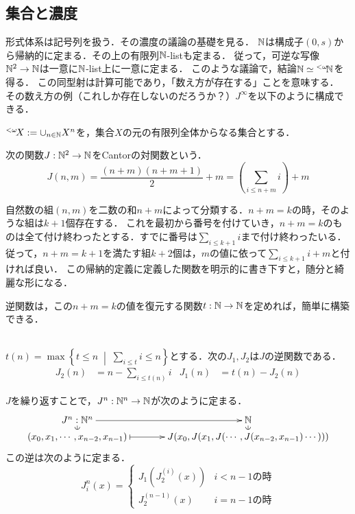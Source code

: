 \documentclass[uplatex, 12pt, dvipdfmx]{jsreport}
\begin{document}
\subsection{集合と濃度}

\begin{screen}
形式体系は記号列を扱う．その濃度の議論の基礎を見る．
$\mathbb{N}$は構成子$(0,s)$から帰納的に定まる．その上の有限列$\mathbb{N}$-listも定まる．
従って，可逆な写像$\mathbb{N}^2\to\mathbb{N}$は一意に$\mathbb{N}$-list上に一意に定まる．
このような議論で，結論$\mathbb{N}\simeq{}^{<\omega}\!\mathbb{N}$を得る．
この同型射は計算可能であり，「数え方が存在する」ことを意味する．
その数え方の例（これしか存在しないのだろうか？）$J^\infty$を以下のように構成できる．
\end{screen}

\begin{notation}
    ${}^{<\omega}\!X:=\cup_{n\in\mathbb{N}}X^n$を，集合$X$の元の有限列全体からなる集合とする．
\end{notation}

\begin{definition}
    次の関数$J:\mathbb{N}^2\to\mathbb{N}$をCantorの対関数という．
    \[ J(n,m) = \frac{(n+m)(n+m+1)}{2} + m = \left(\sum_{i\le n+m}i\right) + m \]
\end{definition}
\begin{remark}
    自然数の組$(n,m)$を二数の和$n+m$によって分類する．$n+m=k$の時，そのような組は$k+1$個存在する．
    これを最初から番号を付けていき，$n+m=k$のものは全て付け終わったとする．すでに番号は$\sum_{i\le k+1}i$まで付け終わったいる．
    従って，$n+m=k+1$を満たす組$k+2$個は，$m$の値に依って$\sum_{i\le k+1}i+m$と付ければ良い．
    この帰納的定義に定義した関数を明示的に書き下すと，随分と綺麗な形になる．

    逆関数は，この$n+m=k$の値を復元する関数$t:\mathbb{N}\to\mathbb{N}$を定めれば，簡単に構築できる．
\end{remark}

\begin{proposition}\mbox{}\\
    $t(n)=\max\left\{t\le n\;\middle|\; \sum_{i\le t}i\le n\right\}$とする．次の$J_1,J_2$は$J$の逆関数である．
    \begin{align*}
        J_2(n) &= n-\sum_{i\le t(n)}i &J_1(n) &= t(n)-J_2(n)
    \end{align*}
\end{proposition}

\begin{remark}
    $J$を繰り返すことで，$J^n:\mathbb{N}^n\to\mathbb{N}$が次のように定まる．
    \[\xymatrix@C=36pt@R=2.8pt{
        J^n:\N^n \ar[r] & \N \\
        (x_0,x_1,\cdots,x_{n-2},x_{n-1}) \ar@{|->}[r] \ar@{(-}[u] & J(x_0,J(x_1,J(\cdots,J(x_{n-2},x_{n-1})\cdots))) \ar@{(-}[u]
    }\]
    この逆は次のように定まる．
    \[J_i^n(x)=\begin{cases}
        J_1(J_2^{(i)}(x)) &i<n-1の時\\
        J_2^{(n-1)}(x) & i=n-1の時
    \end{cases}\]
\end{remark}
\end{document}
